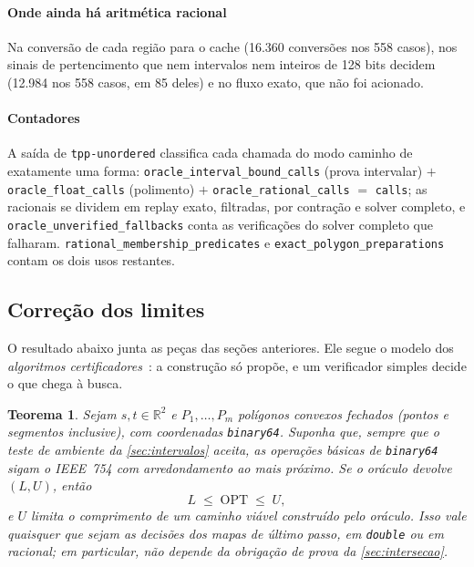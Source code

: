 \documentclass[11pt,a4paper]{article}
\theoremstyle{plain}\newtheorem{proposicao}{Proposição}
\theoremstyle{definition}\newtheorem{definicao}{Definição}
\theoremstyle{plain}\newtheorem{teorema}{Teorema}
\newcommand{\R}{\mathbb R}
\newcommand{\OPT}{\mathrm{OPT}}
\newcommand{\code}[1]{\texttt{\small #1}}
\begin{document}
\paragraph{Onde ainda há aritmética racional} Na conversão de cada região para o cache (16.360 conversões nos 558 casos), nos sinais de pertencimento que nem intervalos nem inteiros de 128 bits decidem (12.984 nos 558 casos, em 85 deles) e no fluxo exato, que não foi acionado.

\paragraph{Contadores} A saída de \code{tpp-unordered} classifica cada chamada do modo caminho de exatamente uma forma: \code{oracle\_interval\_bound\_calls} (prova intervalar) \(+\) \code{oracle\_float\_calls} (polimento) \(+\) \code{oracle\_rational\_calls} \(=\) \code{calls}; as racionais se dividem em replay exato, filtradas, por contração e solver completo, e \code{oracle\_unverified\_fallbacks} conta as verificações do solver completo que falharam. \code{rational\_membership\_predicates} e \code{exact\_polygon\_preparations} contam os dois usos restantes.

\subsection{Correção dos limites}\label{sec:correcao}
O resultado abaixo junta as peças das seções anteriores. Ele segue o modelo dos \emph{algoritmos certificadores}~\cite{certificadores}: a construção só propõe, e um verificador simples decide o que chega à busca.

\begin{teorema}\label{teo:correcao}
Sejam \(s,t\in\R^2\) e \(P_1,\dots,P_m\) polígonos convexos fechados (pontos e segmentos inclusive), com coordenadas \texttt{binary64}. Suponha que, sempre que o teste de ambiente da \cref{sec:intervalos} aceita, as operações básicas de \texttt{binary64} sigam o IEEE~754 com arredondamento ao mais próximo. Se o oráculo devolve \((L,U)\), então
\[
L\;\le\;\OPT\;\le\;U,
\]
e \(U\) limita o comprimento de um caminho viável construído pelo oráculo. Isso vale quaisquer que sejam as decisões dos mapas de último passo, em \texttt{double} ou em racional; em particular, não depende da obrigação de prova da \cref{sec:intersecao}.
\end{teorema}
\end{document}
